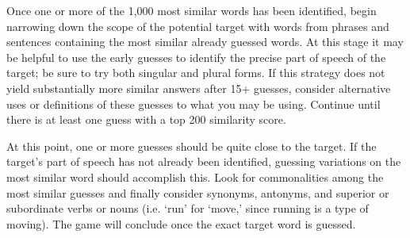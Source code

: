 \documentclass[11pt,letterpaper]{article}
\begin{document}
Once one or more of the 1,000 most similar words has been identified, begin narrowing down the scope of the potential target with words from phrases and sentences containing the most similar already guessed words. At this stage it may be helpful to use the early guesses to identify the precise part of speech of the target; be sure to try both singular and plural forms. If this strategy does not yield substantially more similar answers after 15+ guesses, consider alternative uses or definitions of these guesses to what you may be using. Continue until there is at least one guess with a top 200 similarity score.

At this point, one or more guesses should be quite close to the target. If the target's part of speech has not already been identified, guessing variations on the most similar word should accomplish this. Look for commonalities among the most similar guesses and finally consider synonyms, antonyms, and superior or subordinate verbs or nouns (i.e. `run' for `move,' since running is a type of moving). The game will conclude once the exact target word is guessed.
\end{document}
